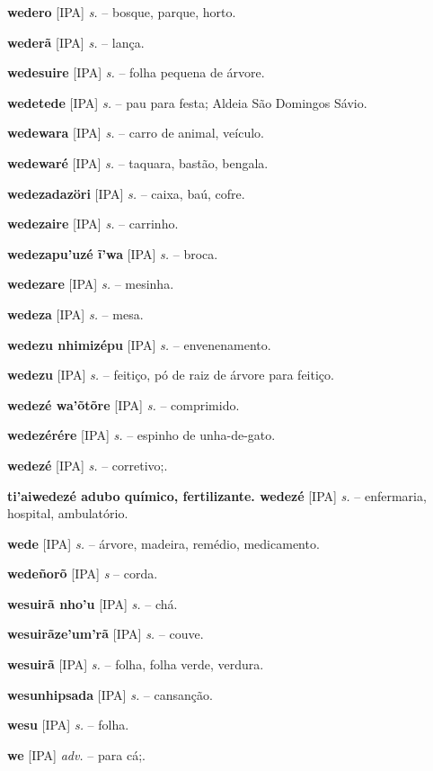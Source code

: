 \textbf{wedero} [IPA] \textit{s.} -- bosque, parque, horto.

\textbf{wederã} [IPA] \textit{s.} -- lança.

\textbf{wedesuire} [IPA] \textit{s.} -- folha pequena de árvore.

\textbf{wedetede} [IPA] \textit{s.} -- pau para festa; Aldeia São Domingos Sávio.

\textbf{wedewara} [IPA] \textit{s.} -- carro de animal, veículo.

\textbf{wedewaré} [IPA] \textit{s.} -- taquara, bastão, bengala.

\textbf{wedezadazöri} [IPA] \textit{s.} -- caixa, baú, cofre.

\textbf{wedezaire} [IPA] \textit{s.} -- carrinho.

\textbf{wedezapu'uzé ĩ'wa} [IPA] \textit{s.} -- broca.

\textbf{wedezare} [IPA] \textit{s.} -- mesinha.

\textbf{wedeza} [IPA] \textit{s.} -- mesa.

\textbf{wedezu nhimizépu} [IPA] \textit{s.} -- envenenamento.

\textbf{wedezu} [IPA] \textit{s.} -- feitiço, pó de raiz de árvore para feitiço.

\textbf{wedezé wa'õtõre} [IPA] \textit{s.} -- comprimido.

\textbf{wedezérére} [IPA] \textit{s.} -- espinho de unha-de-gato.

\textbf{wedezé} [IPA] \textit{s.} -- corretivo;.

\textbf{ti'aiwedezé adubo químico, fertilizante. wedezé} [IPA] \textit{s.} -- enfermaria, hospital, ambulatório.

\textbf{wede} [IPA] \textit{s.} -- árvore, madeira, remédio, medicamento.

\textbf{wedeñorõ} [IPA] \textit{s} -- corda.

\textbf{wesuirã nho'u} [IPA] \textit{s.} -- chá.

\textbf{wesuirãze'um'rã} [IPA] \textit{s.} -- couve.

\textbf{wesuirã} [IPA] \textit{s.} -- folha, folha verde, verdura.

\textbf{wesunhipsada} [IPA] \textit{s.} -- cansanção.

\textbf{wesu} [IPA] \textit{s.} -- folha.

\textbf{we} [IPA] \textit{adv.} -- para cá;.

